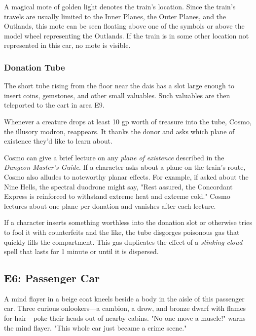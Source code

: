 \documentclass[10pt,a4paper,twoside,bg=print,twocolumn,openany,nodeprecatedcode]{dndarticle}
\begin{document}
A magical mote of golden light denotes the train's location. Since the train's travels are usually limited to the Inner Planes, the Outer Planes, and the Outlands, this mote can be seen floating above one of the symbols or above the model wheel representing the Outlands. If the train is in some other location not represented in this car, no mote is visible.

\subsubsection{Donation Tube}
The short tube rising from the floor near the dais has a slot large enough to insert coins, gemstones, and other small valuables. Such valuables are then teleported to the cart in area E9.

Whenever a creature drops at least 10 gp worth of treasure into the tube, Cosmo, the illusory modron, reappears. It thanks the donor and asks which plane of existence they'd like to learn about.

Cosmo can give a brief lecture on any \textit{plane of existence} described in the \textit{Dungeon Master's Guide}. If a character asks about a plane on the train's route, Cosmo also alludes to noteworthy planar effects. For example, if asked about the Nine Hells, the spectral duodrone might say, "Rest assured, the Concordant Express is reinforced to withstand extreme heat and extreme cold." Cosmo lectures about one plane per donation and vanishes after each lecture.

If a character inserts something worthless into the donation slot or otherwise tries to fool it with counterfeits and the like, the tube disgorges poisonous gas that quickly fills the compartment. This gas duplicates the effect of a \textit{stinking cloud} spell that lasts for 1 minute or until it is dispersed.

\subsection{E6: Passenger Car}
\begin{DndReadAloud}{}
A mind flayer in a beige coat kneels beside a body in the aisle of this passenger car. Three curious onlookers—a cambion, a drow, and bronze dwarf with flames for hair—poke their heads out of nearby cabins. "No one move a muscle!" warns the mind flayer. "This whole car just became a crime scene."

\end{DndReadAloud}
\end{document}

